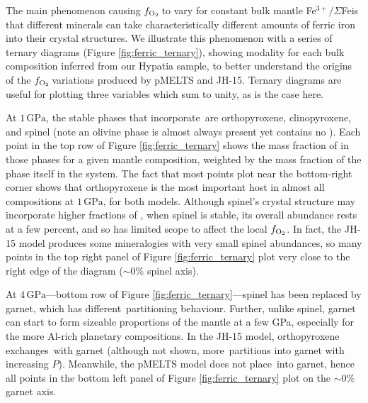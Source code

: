 \documentclass[fleqn,usenatbib,twocolumn]{mnras}
\newcommand{\fo}{$f_{\ce{O2}}$}
\newcommand{\ferric}{\ce{Fe^{3+}}}
\newcommand{\xfer}{Fe$^{3+}/\Sigma$Fe}
\newcommand{\todo}[1]{\textit{\textcolor{violet}{{#1}}}}
\begin{document}

The main phenomenon causing \fo\,to vary for constant bulk mantle \xfer\;is that different minerals can take characteristically different amounts of ferric iron into their crystal structures. We illustrate this phenomenon with a series of ternary diagrams (Figure \ref{fig:ferric_ternary}), showing  modality for each bulk composition inferred from our Hypatia sample, to better understand the origins of the \fo\,variations produced by pMELTS and JH-15. Ternary diagrams are useful for plotting three variables which sum to unity, as is the case here. 

At $1\,\text{GPa}$, the stable phases that incorporate \ferric\,are orthopyroxene, clinopyroxene, and spinel (note an olivine phase is almost always present yet contains no \ferric). Each point in the top row of Figure \ref{fig:ferric_ternary} shows the mass fraction of  in those phases for a given mantle composition, weighted by the mass fraction of the phase itself in the system. The fact that most points plot near the bottom-right corner shows that orthopyroxene is the most important \ferric\;host in almost all compositions at $1\,\text{GPa}$, for both models. Although spinel's crystal structure may incorporate higher fractions of , when spinel is stable, its overall abundance rests at a few percent, and so has limited scope to affect the local \fo. In fact, the JH-15 model produces some mineralogies with very small spinel abundances, so many points in the top right panel of Figure \ref{fig:ferric_ternary} plot very close to the right edge of the diagram ($\sim$0\% spinel axis).

At $4\,\text{GPa}$---bottom row of Figure \ref{fig:ferric_ternary}---spinel has been replaced by garnet, which has different \ferric\,partitioning behaviour. Further, unlike spinel, garnet can start to form sizeable proportions of the mantle at a few GPa, especially for the more Al-rich planetary compositions. In the JH-15 model, orthopyroxene exchanges \ferric\,with garnet (although not shown, more \ferric\,partitions into garnet with increasing $P$). Meanwhile, the pMELTS model does not place \ferric\,into garnet, hence all points in the bottom left panel of Figure \ref{fig:ferric_ternary} plot on the $\sim$0\% garnet axis. %
\end{document}
